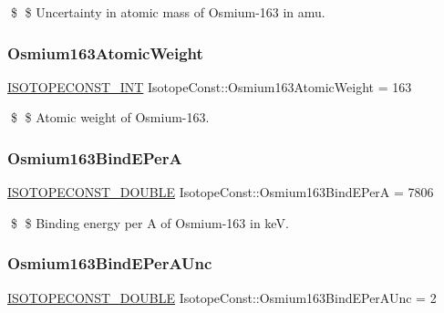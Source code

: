 \$ \$ Uncertainty in atomic mass of Osmium-\/163 in amu. \mbox{\label{group___isotope_const-_osmium-_os163_ga7a96915f52f36a850fb20954eb4883ed}} 
\subsubsection{\texorpdfstring{Osmium163\+Atomic\+Weight}{Osmium163AtomicWeight}}
{\footnotesize\ttfamily \mbox{\hyperlink{group___isotope_const-_macros_ga5f18360b3e99483a35c32d789e62621c}{I\+S\+O\+T\+O\+P\+E\+C\+O\+N\+S\+T\+\_\+\+I\+NT}} Isotope\+Const\+::\+Osmium163\+Atomic\+Weight = 163}

\$ \$ Atomic weight of Osmium-\/163. \mbox{\label{group___isotope_const-_osmium-_os163_ga3dfd12555121cdc8e0be658aff8a1bd9}} 
\subsubsection{\texorpdfstring{Osmium163\+Bind\+E\+PerA}{Osmium163BindEPerA}}
{\footnotesize\ttfamily \mbox{\hyperlink{group___isotope_const-_macros_ga8f45a7272ce02c0b4c65c44636ed719a}{I\+S\+O\+T\+O\+P\+E\+C\+O\+N\+S\+T\+\_\+\+D\+O\+U\+B\+LE}} Isotope\+Const\+::\+Osmium163\+Bind\+E\+PerA = 7806}

\$ \$ Binding energy per A of Osmium-\/163 in keV. \mbox{\label{group___isotope_const-_osmium-_os163_ga8abb187e9a6d3943c923401e98f09b06}} 
\subsubsection{\texorpdfstring{Osmium163\+Bind\+E\+Per\+A\+Unc}{Osmium163BindEPerAUnc}}
{\footnotesize\ttfamily \mbox{\hyperlink{group___isotope_const-_macros_ga8f45a7272ce02c0b4c65c44636ed719a}{I\+S\+O\+T\+O\+P\+E\+C\+O\+N\+S\+T\+\_\+\+D\+O\+U\+B\+LE}} Isotope\+Const\+::\+Osmium163\+Bind\+E\+Per\+A\+Unc = 2}

